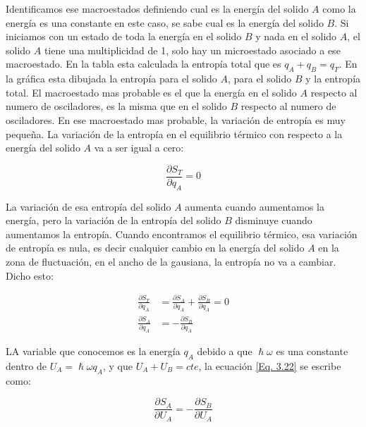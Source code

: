 \documentclass[11pt,fleqn]{book}
\begin{document}

Identificamos ese macroestados definiendo cual es la energía del solido $A$ como la energía es una constante en este caso, se sabe cual es la energía del solido $B$. Si iniciamos con un estado de toda la energía en el solido $B$ y nada en el solido $A$, el solido $A$ tiene una multiplicidad de 1, solo hay un microestado asociado a ese macroestado. En la tabla esta calculada la entropía total que es $q_{A}+q_{B}=q_{T}$. En la gráfica esta dibujada la entropía para el solido $A$, para el solido $B$ y la entropía total. El macroestado mas probable es el que la energía en el solido $A$ respecto al numero de osciladores, es la misma que en el solido $B$ respecto al numero de osciladores. En ese macroestado mas  probable, la variación de entropía es muy pequeña. La variación de la entropía en el equilibrio térmico con respecto a la energía del solido $A$ va a ser igual a cero:

\begin{equation}
\frac{\partial S_{T}}{\partial q_{A}}=0
    \label{Eq. 3.21}
\end{equation}

La variación de esa entropía del solido $A$ aumenta cuando aumentamos la energía, pero la variación de la entropía del solido $B$ disminuye cuando aumentamos la entropía. Cuando encontramos el equilibrio térmico, esa variación de entropía es nula, es decir cualquier cambio en la energía del solido $A$ en la zona de fluctuación, en el ancho de la gausiana, la entropía no va a cambiar. Dicho esto:

\begin{equation}
\begin{split}
    \frac{\partial S_{T}}{\partial q_{A}}&=\frac{\partial S_{A}}{\partial q_{A}}+\frac{\partial S_{B}}{\partial q_{A}}=0\\
    \frac{\partial S_{A}}{\partial q_{A}}&=-\frac{\partial S_{B}}{\partial q_{A}}
    \end{split}
    \label{Eq. 3.22}
\end{equation}

LA variable que conocemos es la energía $q_{A}$ debido a que $\hslash\omega$ es una constante dentro de $U_{A}=\hslash\omega q_{A}$, y que $U_{A}+U_{B}=cte$, la ecuación \ref{Eq. 3.22} se escribe como:

\begin{equation*}
    \frac{\partial S_{A}}{\partial U_{A}}=-\frac{\partial S_{B}}{\partial U_{A}}
\end{equation*}
\end{document}
